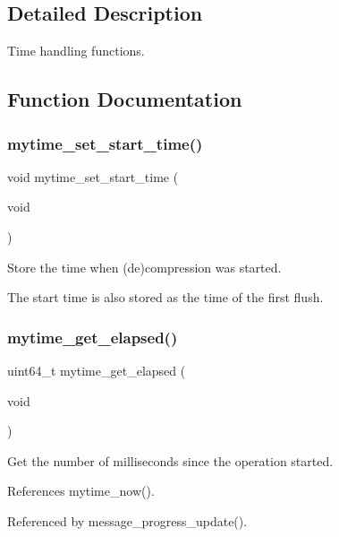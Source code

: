 \subsection{Detailed Description}
Time handling functions. 



\subsection{Function Documentation}
\mbox{\label{mytime_8h_abc987b617c3d37bb64f26e2e6a1047f8}} 
\subsubsection{mytime\+\_\+set\+\_\+start\+\_\+time()}
{\footnotesize\ttfamily void mytime\+\_\+set\+\_\+start\+\_\+time (\begin{DoxyParamCaption}\item[{void}]{ }\end{DoxyParamCaption})}



Store the time when (de)compression was started. 

The start time is also stored as the time of the first flush. \mbox{\label{mytime_8h_a1cbb67212ba8955425ec3ae30f854964}} 
\subsubsection{mytime\+\_\+get\+\_\+elapsed()}
{\footnotesize\ttfamily uint64\+\_\+t mytime\+\_\+get\+\_\+elapsed (\begin{DoxyParamCaption}\item[{void}]{ }\end{DoxyParamCaption})}



Get the number of milliseconds since the operation started. 



References mytime\+\_\+now().



Referenced by message\+\_\+progress\+\_\+update().

